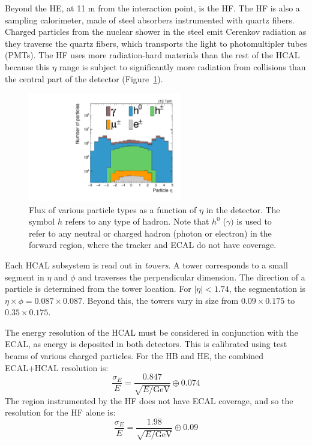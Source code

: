 Beyond the HE, at 11 m from the interaction point, is the HF.
The HF is also a sampling calorimeter, made of steel absorbers instrumented with quartz fibers.
Charged particles from the nuclear shower in the steel emit Cerenkov radiation as they traverse the quartz fibers, which transports the light to photomultipler tubes (PMTs).
The HF uses more radiation-hard materials than the rest of the HCAL because this $\eta$ range is subject to significantly more radiation from collisions than the central part of the detector (Figure~\ref{fig:cms:flux}). 

\begin{figure}[]
    \begin{center}
        \includegraphics[width=0.6\textwidth]{figures/cms/flux.pdf}
        \caption{Flux of various particle types as a function of $\eta$ in the detector.
             The symbol $h$ refers to any type of hadron.
             Note that $h^0$ ($\gamma)$ is used to refer to any neutral or charged hadron (photon or electron) in the forward region, where the tracker and ECAL do not have coverage.}
        \label{fig:cms:flux}
    \end{center}
\end{figure}

Each HCAL subsystem is read out in \emph{towers}.
A tower corresponds to a small segment in $\eta$ and $\phi$ and traverses the perpendicular dimension.
The direction of a particle is determined from the tower location.
For $|\eta|<1.74$, the segmentation is $\eta\times\phi = 0.087\times0.087$.
Beyond this, the towers vary in size from $0.09\times0.175$  to $0.35\times0.175$.

The energy resolution of the HCAL must be considered in conjunction with the ECAL, as energy is deposited in both detectors.
This is calibrated using test beams of various charged particles.
For the HB and HE, the combined ECAL+HCAL resolution is:
\begin{equation}
    \frac{\sigma_E}{E} = \frac{0.847}{\sqrt{E/\mathrm{GeV}}} \oplus 0.074
\end{equation}
The region instrumented by the HF does not have ECAL coverage, and so the resolution for the HF alone is:
\begin{equation}
    \frac{\sigma_E}{E} = \frac{1.98}{\sqrt{E/\mathrm{GeV}}} \oplus 0.09
\end{equation}

